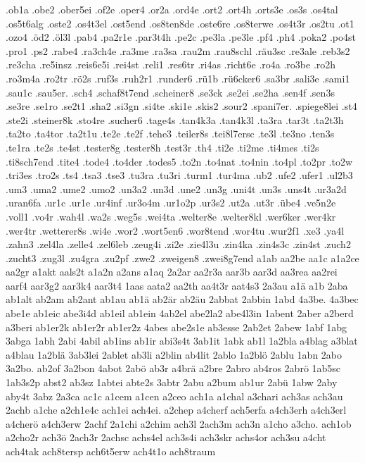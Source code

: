 {.ob1a
.obe2
.ober5ei
.of2e
.oper4
.or2a
.ord4e
.ort2
.ort4h
.orts3e
.os3s
.os4tal
.os5t6alg
.oste2
.os4t3el
.ost5end
.os8ten8de
.oste6re
.os8terwe
.os4t3r
.os2tu
.ot1
.ozo4
.öd2
.öl3l
.pab4
.pa2r1e
.par3t4h
.pe2c
.pe3la
.pe3le
.pf4
.ph4
.poka2
.po4st
.pro1
.ps2
.rabe4
.ra3ch4e
.ra3me
.ra3sa
.rau2m
.rau8schl
.räu3sc
.re3ale
.reb3s2
.re3cha
.re5insz
.reis6e5i
.rei4st
.reli1
.res6tr
.ri4as
.richt6e
.ro4a
.ro3be
.ro2h
.ro3m4a
.ro2tr
.rö2s
.ruf3s
.ruh2r1
.runder6
.rü1b
.rü6cker6
.sa3br
.sali3e
.sami1
.sau1c
.sau5er.
.sch4
.schaf8t7end
.scheiner8
.se3ck
.se2ei
.se2ha
.sen4f
.sen3s
.se3re
.se1ro
.se2t1
.sha2
.si3gn
.si4te
.ski1e
.skis2
.sour2
.spani7er.
.spiege8lei
.st4
.ste2i
.steiner8k
.sto4re
.sucher6
.tage4s
.tan4k3a
.tan4k3l
.ta3ra
.tar3t
.ta2t3h
.ta2to
.ta4tor
.ta2t1u
.te2e
.te2f
.tehe3
.teiler8s
.tei8l7ersc
.te3l
.te3no
.ten3s
.te1ra
.te2s
.te4st
.tester8g
.tester8h
.test3r
.th4
.ti2e
.ti2me
.ti4mes
.ti2s
.ti8sch7end
.tite4
.tode4
.to4der
.todes5
.to2n
.to4nat
.to4nin
.to4pl
.to2pr
.to2w
.tri3es
.tro2s
.ts4
.tsa3
.tse3
.tu3ra
.tu3ri
.turm1
.tur4ma
.ub2
.ufe2
.ufer1
.ul2b3
.um3
.uma2
.ume2
.umo2
.un3a2
.un3d
.une2
.un3g
.uni4t
.un3s
.uns4t
.ur3a2d
.uran6fa
.ur1c
.ur1e
.ur4inf
.ur3o4m
.ur1o2p
.ur3s2
.ut2a
.ut3r
.übe4
.ve5n2e
.voll1
.vo4r
.wah4l
.wa2s
.weg5s
.wei4ta
.welter8e
.welter8kl
.wer6ker
.wer4kr
.wer4tr
.wetterer8s
.wi4e
.wor2
.wort5en6
.wor8tend
.wor4tu
.wur2f1
.xe3
.ya4l
.zahn3
.zel4la
.zelle4
.zel6leb
.zeug4i
.zi2e
.zie4l3u
.zin4ka
.zin4s3c
.zin4st
.zuch2
.zucht3
.zug3l
.zu4gra
.zu2pf
.zwe2
.zweigen8
.zwei8g7end
a1ab
aa2be
aa1c
a1a2ce
aa2gr
a1akt
aals2t
a1a2n
a2ans
a1aq
2a2ar
aa2r3a
aar3b
aar3d
aa3rea
aa2rei
aarf4
aar3g2
aar3k4
aar3t4
1aas
aata2
aa2th
aa4t3r
aat4s3
2a3au
a1ä
a1b
2aba
ab1alt
ab2am
ab2ant
ab1au
ab1ä
ab2är
ab2äu
2abbat
2abbin
1abd
4a3be.
4a3bec
abe1e
ab1eic
abe3i4d
ab1eil
ab1ein
4ab2el
abe2la2
abe4l3in
1abent
2aber
a2berd
a3beri
ab1er2k
ab1er2r
ab1er2z
4abes
abe2s1e
ab3esse
2ab2et
2abew
1abf
1abg
3abga
1abh
2abi
4abil
ab1ins
ab1ir
abi3s4t
3ab1it
1abk
ab1l
1a2bla
a4blag
a3blat
a4blau
1a2blä
3ab3lei
2ablet
ab3li
a2blin
ab4lit
2ablo
1a2blö
2ablu
1abn
2abo
3a2bo.
ab2of
3a2bon
4abot
2abö
ab3r
a4brä
a2bre
2abro
ab4ros
2abrö
1ab5sc
1ab3s2p
abst2
ab3sz
1abtei
abte2s
3abtr
2abu
a2bum
ab1ur
2abü
1abw
2aby
aby4t
3abz
2a3ca
ac1c
a1cem
a1cen
a2ceo
ach1a
a1chal
a3chari
ach3as
ach3au
2achb
a1che
a2ch1e4c
ach1ei
ach4ei.
a2chep
a4cherf
ach5erfa
a4ch3erh
a4ch3erl
a4cherö
a4ch3erw
2achf
2a1chi
a2chim
ach3l
2ach3m
ach3n
a1cho
a3cho.
ach1ob
a2cho2r
ach3ö
2ach3r
2achsc
achs4el
ach3s4i
ach3skr
achs4or
ach3su
a4cht
ach4tak
ach8tersp
ach6t5erw
ach4t1o
ach8traum
}
